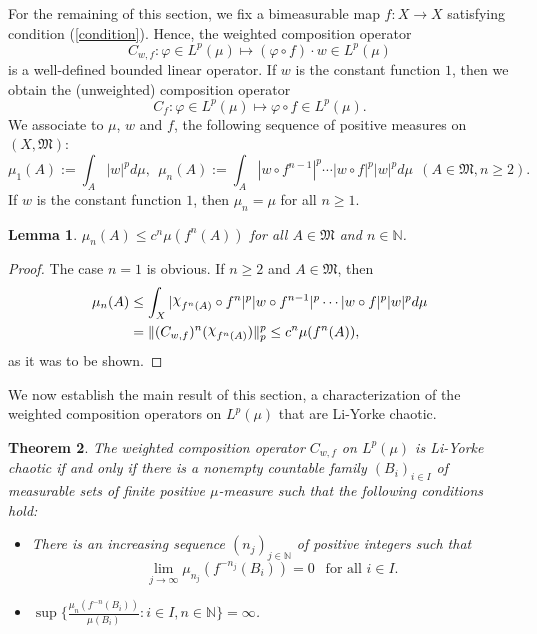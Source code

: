 \documentclass[12pt]{amsart}
\theoremstyle{theorem}
\newtheorem{theorem}{Theorem}%
\newtheorem{lemma}[theorem]{Lemma}
\theoremstyle{definition}
\theoremstyle{remark} \theoremstyle{question} \theoremstyle{example}
\newcommand{\N}{\mathbb{N}}
\newcommand{\fM}{\mathfrak{M}}
\DeclareRobustCommand{\rchi}{{\mathpalette\irchi\relax}}
\newcommand{\irchi}[2]{\raisebox{\depth}{$#1\chi$}}
\begin{document}
\smallskip
For the remaining of this section, we fix a bimeasurable map $f : X \to X$ satisfying condition (\ref{condition}).
Hence, the weighted composition operator
\[
C_{w,f} : \varphi \in L^p(\mu) \mapsto (\varphi \circ f) \cdot w \in L^p(\mu)
\]
is a well-defined bounded linear operator. If $w$ is the constant function $1$, then we obtain the (unweighted) composition operator
\[
C_f : \varphi \in L^p(\mu) \mapsto \varphi \circ f \in L^p(\mu).
\]
We associate to $\mu$, $w$ and $f$, the following sequence of positive measures on $(X,\fM)$:
\[
\mu_1(A)\!:= \int_A |w|^p d\mu, \ \ \mu_n(A)\!:= \int_A |w \circ f^{n-1}|^p \cdots |w \circ f|^p |w|^p d\mu \ \ (A \in \fM, n \geq 2).
\]
If $w$ is the constant function $1$, then $\mu_n = \mu$ for all $n \geq 1$.

\begin{lemma}\label{LemmaC}
$\mu_n(A) \leq c^n \mu(f^n(A))$ for all $A \in \fM$ and $n \in \N$.
\end{lemma}

\begin{proof}
The case $n = 1$ is obvious. If $n \geq 2$ and $A \in \fM$, then
\begin{align*}
\mu_n(A) &\leq \int_X |\rchi_{f^n(A)} \circ f^n|^p |w \circ f^{n-1}|^p \cdots |w \circ f|^p |w|^p d\mu\\
&= \|(C_{w,f})^n(\rchi_{f^n(A)})\|_p^p \leq c^n \mu(f^n(A)),
\end{align*}
as it was to be shown.
\end{proof}

We now establish the main result of this section, a characterization of the weighted composition operators on $L^p(\mu)$ that are Li-Yorke chaotic. 

\begin{theorem}\label{MainLY}
The weighted composition operator $C_{w,f}$ on $L^p(\mu)$ is Li-Yorke chaotic if and only if there is a nonempty countable family 
$(B_i)_{i \in I}$ of measurable sets of finite positive $\mu$-measure such that the following conditions hold:
\begin{itemize}
\item [\rm (A)] There is an increasing sequence $(n_j)_{j \in \N}$ of positive integers such that
\[
\lim_{j \to \infty} \mu_{n_j}(f^{-n_j}(B_i)) = 0 \ \ \text{ for all } i \in I.
\]
\item [\rm (B)] $\displaystyle \sup\Bigg\{\frac{\mu_n(f^{-n}(B_i))}{\mu(B_i)} : i \in I, n \in \N\Bigg\} = \infty$.
\end{itemize}
\end{theorem}
\end{document}
